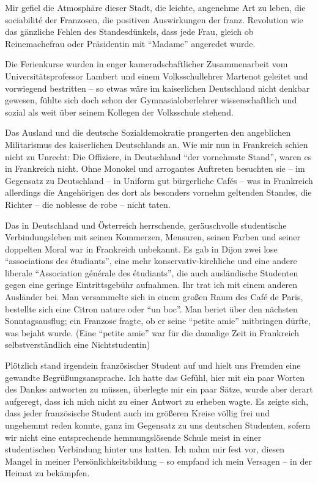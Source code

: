 \documentclass[a5paper,pagesize,10pt,twoside=true]{scrbook}
\renewcommand{\marginpar}[2][]{}
\begin{document}
Mir gefiel die Atmosphäre dieser Stadt, die leichte, angenehme Art zu leben, die sociabilité der Franzosen, die positiven Auswirkungen der franz. Revolution wie das gänzliche Fehlen des Standesdünkels, dass jede Frau, gleich ob Reinemachefrau oder Präsidentin mit \enquote{Madame} angeredet wurde.

\marginpar{108}
Die Ferienkurse wurden in enger kameradschaftlicher Zusammenarbeit vom Universitätsprofessor Lambert und einem Volksschullehrer Martenot geleitet und vorwiegend bestritten -- so etwas wäre im kaiserlichen Deutschland nicht denkbar gewesen, fühlte sich doch schon der Gymnasialoberlehrer wissenschaftlich und sozial als weit über seinem Kollegen der Volksschule stehend.

Das Ausland und die deutsche Sozialdemokratie prangerten den angeblichen Militarismus des kaiserlichen Deutschlands an. Wie mir nun in Frankreich schien nicht zu Unrecht: Die Offiziere, in Deutschland \enquote{der vornehmste Stand}, waren es in Frankreich nicht. Ohne Monokel und arrogantes Auftreten besuchten sie -- im Gegensatz zu Deutschland -- in Uniform gut bürgerliche Cafés -- was in Frankreich allerdings die Angehörigen des dort als besonders vornehm geltenden Standes, die Richter -- die noblesse de robe -- nicht taten.

Das in Deutschland und Österreich herrschende, geräuschvolle studentische Verbindungsleben mit seinen Kommerzen, Mensuren, seinen Farben und seiner doppelten Moral war in Frankreich unbekannt. Es gab in Dijon zwei lose \enquote{associations des étudiants}, eine mehr konservativ-kirchliche und eine andere liberale \enquote{Association générale des étudiants}, die auch ausländische Studenten gegen eine geringe Eintrittsgebühr aufnahmen. Ihr trat ich mit einem anderen Ausländer bei. Man versammelte sich in einem großen Raum des Café de Paris, bestellte sich eine Citron nature oder \enquote{un boc}. Man beriet über den nächsten Sonntagsausflug; ein Franzose fragte, ob er seine \enquote{petite amie} mitbringen dürfte, was bejaht wurde. (Eine \enquote{petite amie} war für die damalige Zeit in Frankreich selbstverständlich eine Nichtstudentin)

Plötzlich stand irgendein französischer Student auf und hielt uns Fremden eine gewandte Begrüßungsansprache. Ich hatte das Gefühl, hier mit ein paar Worten des Dankes antworten zu müssen, überlegte mir ein paar Sätze, wurde aber derart aufgeregt, dass ich mich nicht zu einer Antwort zu erheben wagte. Es zeigte sich, dass jeder französische Student auch im größeren Kreise völlig frei und ungehemmt reden konnte, ganz im Gegensatz zu uns deutschen Studenten, sofern wir nicht eine entsprechende hemmungslösende Schule meist in einer studentischen Verbindung hinter uns hatten. Ich nahm mir fest vor, diesen Mangel in meiner Persönlichkeitsbildung -- so empfand ich mein Versagen -- in der Heimat zu bekämpfen.
\end{document}
